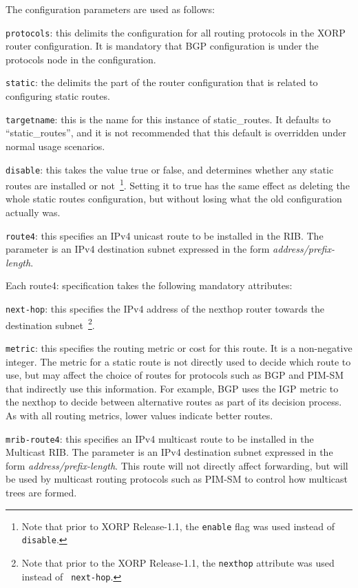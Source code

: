 The configuration parameters are used as follows:
\begin{description}
\item{\tt protocols}: this delimits the configuration for all routing
  protocols in the XORP router configuration.  It is mandatory that
  BGP configuration is under the {\stt protocols} node in the
  configuration.
\item{\tt static}: the delimits the part of the router configuration
  that is related to configuring static routes.
\item{\tt targetname}: this is the name for this instance of
  static\_routes.  It defaults to ``{\stt static\_routes}'', and it is
  not recommended that this default is overridden under normal usage
  scenarios.
\item{\tt disable}: this takes the value {\stt true} or {\stt false},
  and determines whether any static routes are installed or not~\footnote{Note
  that prior to XORP Release-1.1, the {\tt enable} flag was used instead of
  {\tt disable}.}.
  Setting it to {\stt true} has the same effect as deleting the whole
  static routes configuration, but without losing what the old
  configuration actually was.
\item{\tt route4}: this specifies an IPv4 unicast route to be
  installed in the RIB.  The parameter is an IPv4 destination subnet
  expressed in the form {\it address/prefix-length}.

  Each {\stt route4}: specification takes the following mandatory
  attributes:
\begin{description}
\item{\tt next-hop}: this specifies the IPv4 address of the nexthop
  router towards the destination subnet~\footnote{Note that prior to the XORP
  Release-1.1, the {\tt nexthop} attribute was used instead of {\tt
  next-hop}.}.
\item{\tt metric}: this specifies the routing metric or cost for this
  route.  It is a non-negative integer.  The metric for a static route
  is not directly used to decide which route to use, but may affect
  the choice of routes for protocols such as BGP and PIM-SM that
  indirectly use this information.  For example, BGP uses the IGP
  metric to the nexthop to decide between alternative routes as part
  of its decision process.  As with all routing metrics, lower values
  indicate better routes.
\end{description}
\item{\tt mrib-route4}: this specifies an IPv4 multicast route to be
  installed in the Multicast RIB.  The parameter is an IPv4
  destination subnet expressed in the form {\it
  address/prefix-length}.  This route will not directly affect
  forwarding, but will be used by multicast routing protocols such as
  PIM-SM to control how multicast trees are formed.


\end{description}
